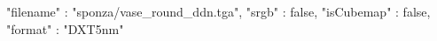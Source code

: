{ 
	"filename" : "sponza/vase_round_ddn.tga", 
	"srgb" : false,
	"isCubemap" : false,
	"format" : "DXT5nm"
}
